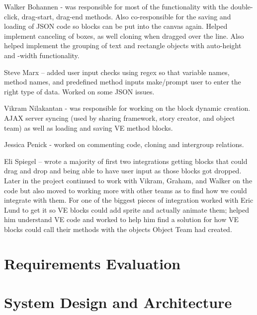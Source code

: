 \documentclass[a4paper]{article}
\begin{document}
Walker Bohannen - was responsible for most of the functionality with the double-click, drag-start, drag-end methods. Also co-responsible for the saving and loading of JSON code so blocks can be put into the canvas again. Helped implement canceling of boxes, as well cloning when dragged over the line. Also helped implement the grouping of text and rectangle objects with auto-height and -width functionality.

Steve Marx – added user input checks using regex so that variable names, method names, and predefined method inputs make/prompt user to enter the right type of data.  Worked on some JSON issues.  

Vikram Nilakantan - was responsible for working on the block dynamic creation. AJAX server syncing (used by sharing framework, story creator, and object team) as well as loading and saving VE method blocks.

Jessica Penick  - worked on commenting code, cloning and intergroup relations.

Eli Spiegel – wrote a majority of first two integrations getting blocks that could drag and drop and being able to have user input as those blocks got dropped. Later in the project continued to work with Vikram, Graham, and Walker on the code but also moved to working more with other teams as to find how we could integrate with them. For one of the biggest pieces of integration worked with Eric Lund to get it so VE blocks could add sprite and actually animate them; helped him understand VE code and worked to help him find a solution for how VE blocks could call their methods with the objects Object Team had created.








\section{Requirements Evaluation}



\section{System Design and Architecture}
\end{document}
